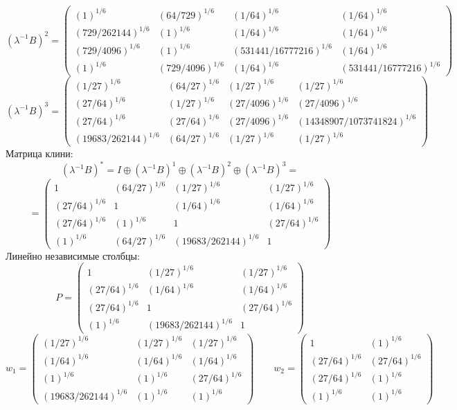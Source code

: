 $$(\lambda^{-1}B)^2 = \begin{pmatrix}
(1)^{1/6} & (64/729)^{1/6} & (1/64)^{1/6} & (1/64)^{1/6}\\
(729/262144)^{1/6} & (1)^{1/6} & (1/64)^{1/6} & (1/64)^{1/6}\\
(729/4096)^{1/6} & (1)^{1/6} & (531441/16777216)^{1/6} & (1/64)^{1/6}\\
(1)^{1/6} & (729/4096)^{1/6} & (1/64)^{1/6} & (531441/16777216)^{1/6}
\end{pmatrix}
$$
$$(\lambda^{-1}B)^3 = \begin{pmatrix}
(1/27)^{1/6} & (64/27)^{1/6} & (1/27)^{1/6} & (1/27)^{1/6}\\
(27/64)^{1/6} & (1/27)^{1/6} & (27/4096)^{1/6} & (27/4096)^{1/6}\\
(27/64)^{1/6} & (27/64)^{1/6} & (27/4096)^{1/6} & (14348907/1073741824)^{1/6}\\
(19683/262144)^{1/6} & (64/27)^{1/6} & (1/27)^{1/6} & (1/27)^{1/6}
\end{pmatrix}
$$
Матрица клини:
$$(\lambda^{-1}B)^* = I \oplus (\lambda^{-1}B)^1 \oplus (\lambda^{-1}B)^2 \oplus (\lambda^{-1}B)^3 = $$
$$ = \begin{pmatrix}
1 & (64/27)^{1/6} & (1/27)^{1/6} & (1/27)^{1/6}\\
(27/64)^{1/6} & 1 & (1/64)^{1/6} & (1/64)^{1/6}\\
(27/64)^{1/6} & (1)^{1/6} & 1 & (27/64)^{1/6}\\
(1)^{1/6} & (64/27)^{1/6} & (19683/262144)^{1/6} & 1
\end{pmatrix}
$$
Линейно независимые столбцы:
$$P = \begin{pmatrix}
1 & (1/27)^{1/6} & (1/27)^{1/6}\\
(27/64)^{1/6} & (1/64)^{1/6} & (1/64)^{1/6}\\
(27/64)^{1/6} & 1 & (27/64)^{1/6}\\
(1)^{1/6} & (19683/262144)^{1/6} & 1
\end{pmatrix}
$$
$$w_1 = \begin{pmatrix}
(1/27)^{1/6} & (1/27)^{1/6} & (1/27)^{1/6}\\
(1/64)^{1/6} & (1/64)^{1/6} & (1/64)^{1/6}\\
(1)^{1/6} & (1)^{1/6} & (27/64)^{1/6}\\
(19683/262144)^{1/6} & (1)^{1/6} & (1)^{1/6}
\end{pmatrix}
\qquad w_2 = \begin{pmatrix}
1 & (1)^{1/6}\\
(27/64)^{1/6} & (27/64)^{1/6}\\
(27/64)^{1/6} & (1)^{1/6}\\
(1)^{1/6} & (1)^{1/6}
\end{pmatrix}
$$
